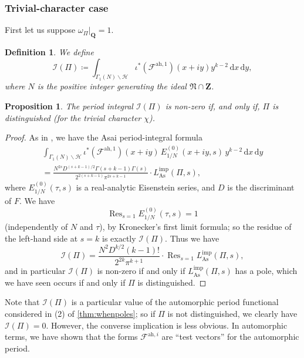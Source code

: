 \documentclass[a4paper,10pt]{amsart}
\theoremstyle{plain}
\newtheorem{proposition}[theorem]{Proposition}
\newtheorem{definition}[theorem]{Definition}
\theoremstyle{remark}
\DeclareMathOperator{\Res}{Res}
\DeclareMathOperator{\imp}{imp}
\DeclareMathOperator{\As}{As}
\newcommand{\QQ}{\mathbf{Q}}
\newcommand{\ZZ}{\mathbf{Z}}
\newcommand{\cF}{\mathcal{F}}
\newcommand{\cH}{\mathcal{H}}
\numberwithin{equation}{section}
\begin{document}
 \subsubsection*{Trivial-character case} First let us suppose $\omega_{\Pi}|_{\QQ} = 1$.

 \begin{definition}
  We define
  \[
   \mathcal{I}(\Pi) \coloneqq \int_{\Gamma_1(N) \backslash \cH} \iota^*\left(\cF^{\mathrm{ah}, 1}\right)(x + iy) y^{k-2}\, \mathrm{d}x\, \mathrm{d}y,
  \]
  where $N$ is the positive integer generating the ideal $\mathfrak{N} \cap \ZZ$.
 \end{definition}

 \begin{proposition}
  The period integral $\mathcal{I}(\Pi)$ is non-zero if, and only if, $\Pi$ is distinguished (for the trivial character $\chi$).
 \end{proposition}

 \begin{proof}
  As in \cite[Theorem 5.3.2]{leiloefflerzerbes18}, we have the Asai period-integral formula
  \begin{multline*}
   \int_{\Gamma_1(N) \backslash \cH} \iota^*\left(\cF^{\mathrm{ah}, 1}\right)(x + iy)\, E^{(0)}_{1/N}(x + iy, s)\, y^{k-2}\, \mathrm{d}x\, \mathrm{d}y \\
   = \frac{N^{2s} D^{(s + k - 1)/2} \Gamma(s + k - 1) \Gamma(s)}{2^{2(s + k - 1)} \pi^{2s + k - 1}}\cdot L_{\As}^{\imp}(\Pi, s),
  \end{multline*}
  where $E^{(0)}_{1/N}(\tau, s)$ is a real-analytic Eisenstein series, and $D$ is the discriminant of $F$. We have
  \[ \Res_{s = 1} E^{(0)}_{1/N}(\tau, s) = 1\]
  (independently of $N$ and $\tau$), by Kronecker's first limit formula; so the residue of the left-hand side at $s = k$ is exactly $\mathcal{I}(\Pi)$. Thus we have
  \[ \mathcal{I}(\Pi) = \frac{N^2 D^{k/2} (k-1)!}{2^{2k} \pi^{k+1}} \cdot \Res_{s = 1} L^{\mathrm{imp}}_{\As}(\Pi, s),\]
  and in particular $\mathcal{I}(\Pi)$ is non-zero if and only if $L^{\mathrm{imp}}_{\As}(\Pi, s)$ has a pole, which we have seen occurs if and only if $\Pi$ is distinguished.
 \end{proof}

 \begin{remark}
  Note that $\mathcal{I}(\Pi)$ is a particular value of the automorphic period functional considered in (2) of \cref{thm:whenpoles}; so if $\Pi$ is not distinguished, we clearly have $\mathcal{I}(\Pi) = 0$. However, the converse implication is less obvious. In automorphic terms, we have shown that the forms $\cF^{\mathrm{ah}, i}$ are ``test vectors'' for the automorphic period.
 \end{remark}
\end{document}
